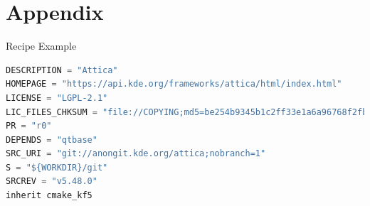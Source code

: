 \documentclass[ucs,9pt]{beamer}
\begin{document}
\section{Appendix}
\begin{frame}[fragile]
    {Recipe Example}

    \begin{example}{}
    \hspace{1em}\begin{minipage}{.95\linewidth}
    \begin{lstlisting}[caption=attica\_5.48.0.bb,language=Python]
DESCRIPTION = "Attica"
HOMEPAGE = "https://api.kde.org/frameworks/attica/html/index.html"
LICENSE = "LGPL-2.1"
LIC_FILES_CHKSUM = "file://COPYING;md5=be254b9345b1c2ff33e1a6a96768f2fb"
PR = "r0"
DEPENDS = "qtbase"
SRC_URI = "git://anongit.kde.org/attica;nobranch=1"
S = "${WORKDIR}/git"
SRCREV = "v5.48.0"
inherit cmake_kf5
    \end{lstlisting}
    \end{minipage}
    \end{example}
\end{frame}
\end{document}
